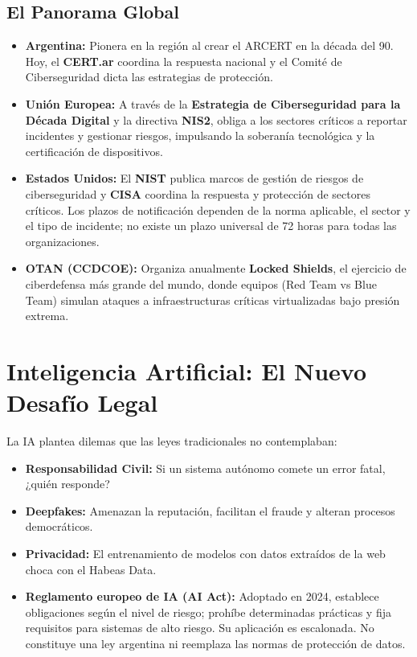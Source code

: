 \documentclass[11pt,a4paper]{article}
\begin{document}
\subsection{El Panorama Global}
\begin{itemize}[leftmargin=*]
  \item \textbf{Argentina:} Pionera en la región al crear el ARCERT en la década del 90. Hoy, el \textbf{CERT.ar} coordina la respuesta nacional y el Comité de Ciberseguridad dicta las estrategias de protección.
  \item \textbf{Unión Europea:} A través de la \textbf{Estrategia de Ciberseguridad para la Década Digital} y la directiva \textbf{NIS2}, obliga a los sectores críticos a reportar incidentes y gestionar riesgos, impulsando la soberanía tecnológica y la certificación de dispositivos.
  \item \textbf{Estados Unidos:} El \textbf{NIST} publica marcos de gestión de riesgos de ciberseguridad y \textbf{CISA} coordina la respuesta y protección de sectores críticos. Los plazos de notificación dependen de la norma aplicable, el sector y el tipo de incidente; no existe un plazo universal de 72 horas para todas las organizaciones.
  \item \textbf{OTAN (CCDCOE):} Organiza anualmente \textbf{Locked Shields}, el ejercicio de ciberdefensa más grande del mundo, donde equipos (Red Team vs Blue Team) simulan ataques a infraestructuras críticas virtualizadas bajo presión extrema.
\end{itemize}

\section{Inteligencia Artificial: El Nuevo Desafío Legal}
La IA plantea dilemas que las leyes tradicionales no contemplaban:
\begin{itemize}[leftmargin=*]
  \item \textbf{Responsabilidad Civil:} Si un sistema autónomo comete un error fatal, ¿quién responde?
  \item \textbf{Deepfakes:} Amenazan la reputación, facilitan el fraude y alteran procesos democráticos.
  \item \textbf{Privacidad:} El entrenamiento de modelos con datos extraídos de la web choca con el Habeas Data.
  \item \textbf{Reglamento europeo de IA (AI Act):} Adoptado en 2024, establece obligaciones según el nivel de riesgo; prohíbe determinadas prácticas y fija requisitos para sistemas de alto riesgo. Su aplicación es escalonada. No constituye una ley argentina ni reemplaza las normas de protección de datos.
\end{itemize}
\end{document}
